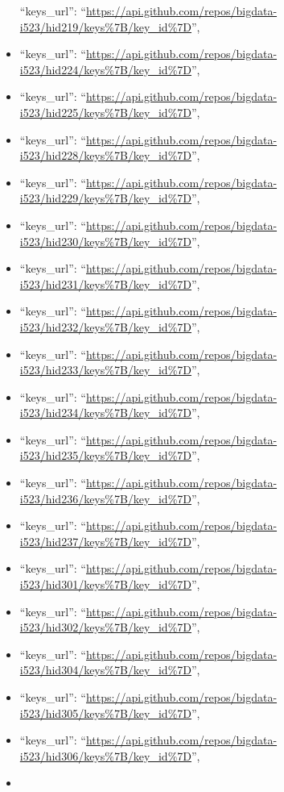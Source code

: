 \begin{itemize}
  ``keys\_url'':
  ``\url{https://api.github.com/repos/bigdata-i523/hid219/keys\%7B/key_id\%7D}'',
\item
  ``keys\_url'':
  ``\url{https://api.github.com/repos/bigdata-i523/hid224/keys\%7B/key_id\%7D}'',
\item
  ``keys\_url'':
  ``\url{https://api.github.com/repos/bigdata-i523/hid225/keys\%7B/key_id\%7D}'',
\item
  ``keys\_url'':
  ``\url{https://api.github.com/repos/bigdata-i523/hid228/keys\%7B/key_id\%7D}'',
\item
  ``keys\_url'':
  ``\url{https://api.github.com/repos/bigdata-i523/hid229/keys\%7B/key_id\%7D}'',
\item
  ``keys\_url'':
  ``\url{https://api.github.com/repos/bigdata-i523/hid230/keys\%7B/key_id\%7D}'',
\item
  ``keys\_url'':
  ``\url{https://api.github.com/repos/bigdata-i523/hid231/keys\%7B/key_id\%7D}'',
\item
  ``keys\_url'':
  ``\url{https://api.github.com/repos/bigdata-i523/hid232/keys\%7B/key_id\%7D}'',
\item
  ``keys\_url'':
  ``\url{https://api.github.com/repos/bigdata-i523/hid233/keys\%7B/key_id\%7D}'',
\item
  ``keys\_url'':
  ``\url{https://api.github.com/repos/bigdata-i523/hid234/keys\%7B/key_id\%7D}'',
\item
  ``keys\_url'':
  ``\url{https://api.github.com/repos/bigdata-i523/hid235/keys\%7B/key_id\%7D}'',
\item
  ``keys\_url'':
  ``\url{https://api.github.com/repos/bigdata-i523/hid236/keys\%7B/key_id\%7D}'',
\item
  ``keys\_url'':
  ``\url{https://api.github.com/repos/bigdata-i523/hid237/keys\%7B/key_id\%7D}'',
\item
  ``keys\_url'':
  ``\url{https://api.github.com/repos/bigdata-i523/hid301/keys\%7B/key_id\%7D}'',
\item
  ``keys\_url'':
  ``\url{https://api.github.com/repos/bigdata-i523/hid302/keys\%7B/key_id\%7D}'',
\item
  ``keys\_url'':
  ``\url{https://api.github.com/repos/bigdata-i523/hid304/keys\%7B/key_id\%7D}'',
\item
  ``keys\_url'':
  ``\url{https://api.github.com/repos/bigdata-i523/hid305/keys\%7B/key_id\%7D}'',
\item
  ``keys\_url'':
  ``\url{https://api.github.com/repos/bigdata-i523/hid306/keys\%7B/key_id\%7D}'',
\item

\end{itemize}
